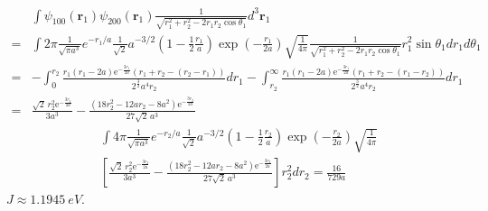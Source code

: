 \begin{enumerate}
    \begin{align*}
        &\int\psi_{100}(\bm r_1)\psi_{200}(\bm r_1)\frac{1}{\sqrt{r_1^2+r_2^2-2r_1r_2\cos\theta_1}}d^3\bm r_1\\
        =&
        \int2\pi\frac{1}{\sqrt{\pi a^3}}e^{-r_1/a}
        \frac{1}{\sqrt{2}}a^{-3/2}\left(
        1-\frac{1}{2}\frac{r_1}{a}
        \right)
        \exp(-\frac{r_1}{2a})\sqrt{\frac{1}{4\pi}}
        \frac{1}{\sqrt{r_1^2+r_2^2-2r_1r_2\cos\theta_1}}r_1^2\sin\theta_1 dr_1d\theta_1\\
        =&
        -\int_0^{r_2}
        \frac{r_{1} \left(r_{1} - 2a\right) \mathrm{e}^{-\frac{3r_{1}}{2a}} \left(r_1+r_2-(r_2-r_1)\right)}{2^{\frac{3}{2}} a^{4} r_{2}}dr_1
        -\int_{r_2}^\infty
        \frac{r_{1} \left(r_{1} - 2a\right) \mathrm{e}^{-\frac{3r_{1}}{2a}} \left(r_1+r_2-(r_1-r_2)\right)}{2^{\frac{3}{2}} a^{4} r_{2}}dr_1\\
        =&
        \frac{\sqrt{2} \, r_{2}^{2} \mathrm{e}^{-\frac{3r_{2}}{2a}}}{3a^{3}}
        -\frac{\left(18r_{2}^{2} - 12ar_{2} - 8a^{2}\right) \mathrm{e}^{-\frac{3r_{2}}{2a}}}{27 \sqrt{2} \, a^{3}}
    \end{align*}
    \begin{align*}
        &\int
        4\pi\frac{1}{\sqrt{\pi a^3}}e^{-r_2/a}
        \frac{1}{\sqrt{2}}a^{-3/2}\left(
        1-\frac{1}{2}\frac{r_2}{a}
        \right)
        \exp(-\frac{r_2}{2a})\sqrt{\frac{1}{4\pi}}\\
        &\left[
        \frac{\sqrt{2} \, r_{2}^{2} \mathrm{e}^{-\frac{3r_{2}}{2a}}}{3a^{3}}
        -\frac{\left(18r_{2}^{2} - 12ar_{2} - 8a^{2}\right) \mathrm{e}^{-\frac{3r_{2}}{2a}}}{27 \sqrt{2} \, a^{3}}
        \right]r_2^2dr_2=\frac{16}{729a}
    \end{align*}
    $J\approx \qty{1.1945}{eV}.$
    
\end{enumerate}

